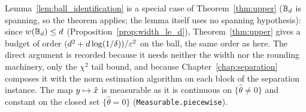 \begin{remark}
Lemma~\ref{lem:ball_identification} is a special case of Theorem~\ref{thm:upper} ($\mathbb{B}_d$ is
spanning, so the theorem applies; the lemma itself uses no spanning hypothesis): since
$w(\mathbb{B}_d) \le d$ (Proposition~\ref{prop:width_le_d}), Theorem~\ref{thm:upper} gives a budget of
order $(d^2 + d\log(1/\delta))/\varepsilon^2$ on the ball, the same order as here. The direct argument is
recorded because it needs neither the width nor the rounding machinery, only the
$\chi^2$ tail bound, and because Chapter~\ref{chap:separation} composes it with the norm
estimation algorithm on each block of the separation instance. The map $y \mapsto \hat{x}$ is
measurable as it is continuous on $\{\hat\theta \ne 0\}$ and constant on the closed set
$\{\hat\theta = 0\}$ (\texttt{Measurable.piecewise}).
\end{remark}

